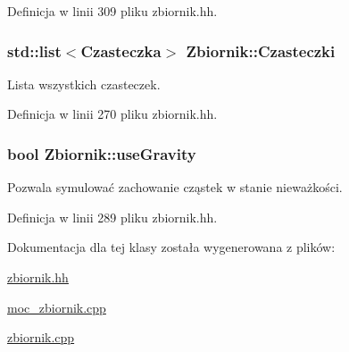 Definicja w linii 309 pliku zbiornik.\-hh.

\hypertarget{class_zbiornik_a751209f2f02a7eaf3b7a3283d8fcd3ad}{
\subsubsection[{Czasteczki}]{\setlength{\rightskip}{0pt plus 5cm}std\-::list$<${\bf Czasteczka}$>$ Zbiornik\-::\-Czasteczki}}\label{class_zbiornik_a751209f2f02a7eaf3b7a3283d8fcd3ad}
Lista wszystkich czasteczek. 

Definicja w linii 270 pliku zbiornik.\-hh.

\hypertarget{class_zbiornik_adf42e0df5f2af3160a1ff2e1360efe8a}{
\subsubsection[{use\-Gravity}]{\setlength{\rightskip}{0pt plus 5cm}bool Zbiornik\-::use\-Gravity}}\label{class_zbiornik_adf42e0df5f2af3160a1ff2e1360efe8a}
Pozwala symulować zachowanie cząstek w stanie nieważkości. 

Definicja w linii 289 pliku zbiornik.\-hh.



Dokumentacja dla tej klasy została wygenerowana z plików\-:\begin{DoxyCompactItemize}
\item 
\hyperlink{zbiornik_8hh}{zbiornik.\-hh}\item 
\hyperlink{moc__zbiornik_8cpp}{moc\-\_\-zbiornik.\-cpp}\item 
\hyperlink{zbiornik_8cpp}{zbiornik.\-cpp}\end{DoxyCompactItemize}
